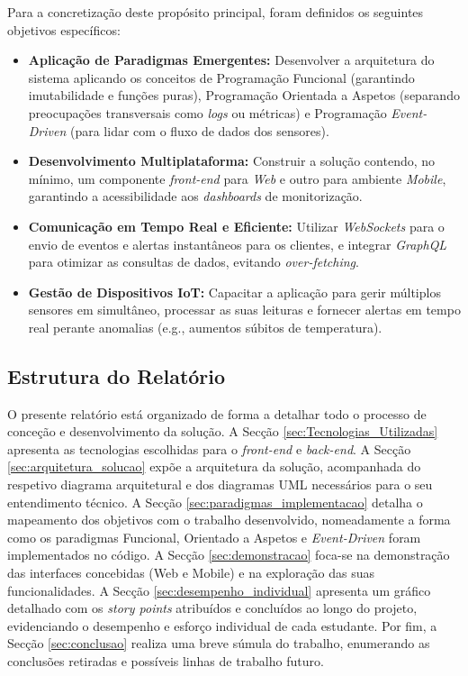 Para a concretização deste propósito principal, foram definidos os seguintes objetivos específicos:
\begin{itemize}
	\item \textbf{Aplicação de Paradigmas Emergentes:} Desenvolver a arquitetura do sistema aplicando os conceitos de Programação Funcional (garantindo imutabilidade e funções puras), Programação Orientada a Aspetos (separando preocupações transversais como \textit{logs} ou métricas) e Programação \textit{Event-Driven} (para lidar com o fluxo de dados dos sensores).
	\item \textbf{Desenvolvimento Multiplataforma:} Construir a solução contendo, no mínimo, um componente \textit{front-end} para \textit{Web} e outro para ambiente \textit{Mobile}, garantindo a acessibilidade aos \textit{dashboards} de monitorização.
	\item \textbf{Comunicação em Tempo Real e Eficiente:} Utilizar \textit{WebSockets} para o envio de eventos e alertas instantâneos para os clientes, e integrar \textit{GraphQL} para otimizar as consultas de dados, evitando \textit{over-fetching}.
	\item \textbf{Gestão de Dispositivos IoT:} Capacitar a aplicação para gerir múltiplos sensores em simultâneo, processar as suas leituras e fornecer alertas em tempo real perante anomalias (e.g., aumentos súbitos de temperatura).
\end{itemize}

\subsection{Estrutura do Relatório}

O presente relatório está organizado de forma a detalhar todo o processo de conceção e desenvolvimento da solução. A Secção \ref{sec:Tecnologias_Utilizadas} apresenta as tecnologias escolhidas para o \textit{front-end} e \textit{back-end}. A Secção \ref{sec:arquitetura_solucao} expõe a arquitetura da solução, acompanhada do respetivo diagrama arquitetural e dos diagramas UML necessários para o seu entendimento técnico. A Secção \ref{sec:paradigmas_implementacao} detalha o mapeamento dos objetivos com o trabalho desenvolvido, nomeadamente a forma como os paradigmas Funcional, Orientado a Aspetos e \textit{Event-Driven} foram implementados no código. A Secção \ref{sec:demonstracao} foca-se na demonstração das interfaces concebidas (Web e Mobile) e na exploração das suas funcionalidades. A Secção \ref{sec:desempenho_individual} apresenta um gráfico detalhado com os \textit{story points} atribuídos e concluídos ao longo do projeto, evidenciando o desempenho e esforço individual de cada estudante. Por fim, a Secção \ref{sec:conclusao} realiza uma breve súmula do trabalho, enumerando as conclusões retiradas e possíveis linhas de trabalho futuro.